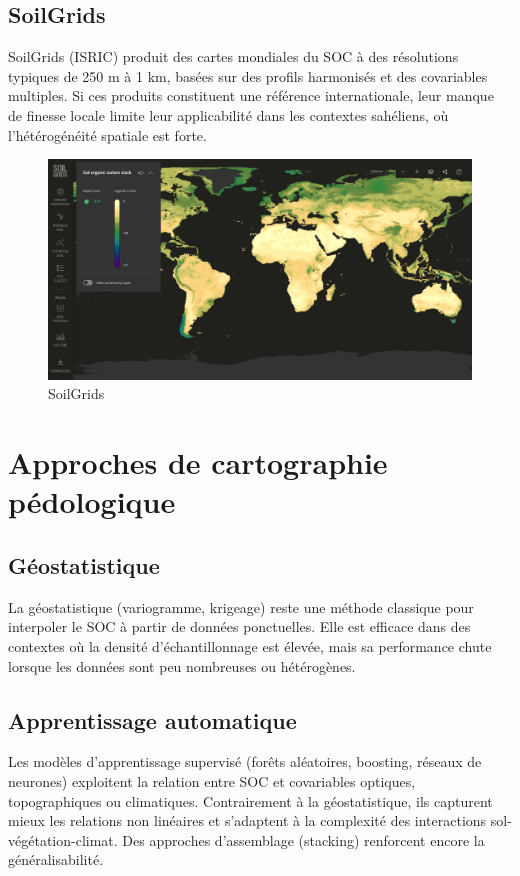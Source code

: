 \documentclass[12pt,a4paper,oneside]{report}
\begin{document}
\subsection{SoilGrids}
SoilGrids \cite{soilgrids} (ISRIC) produit des cartes mondiales du SOC à des résolutions typiques de 250 m à 1 km, basées sur des profils harmonisés et des covariables multiples. Si ces produits constituent une référence internationale, leur manque de finesse locale limite leur applicabilité dans les contextes sahéliens, où l’hétérogénéité spatiale est forte.
\begin{figure}[h]
    \centering
    \includegraphics[width=0.9\linewidth]{images/soilgris.png}
    \caption{SoilGrids}
    \label{fig:soilgris}
\end{figure}
\section{Approches de cartographie pédologique}
\subsection{Géostatistique}
La géostatistique \cite{cressie_geostatistics_1989} (variogramme, krigeage) reste une méthode classique pour interpoler le SOC à partir de données ponctuelles. Elle est efficace dans des contextes où la densité d’échantillonnage est élevée, mais sa performance chute lorsque les données sont peu nombreuses ou hétérogènes.
\subsection{Apprentissage automatique}
Les modèles d’apprentissage supervisé (forêts aléatoires, boosting, réseaux de neurones) exploitent \cite{liu_transfer_2018,dong_prediction_2024} la relation entre SOC et covariables optiques, topographiques ou climatiques. Contrairement à la géostatistique, ils capturent mieux les relations non linéaires et s’adaptent à la complexité des interactions sol-végétation-climat. Des approches d’assemblage (stacking) renforcent encore la généralisabilité.
\end{document}
